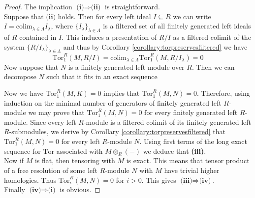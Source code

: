 \begin{proof}
The implication $\textbf{(i)}\Rightarrow \textbf{(ii)}$ is straightforward.\\
Suppose that $\textbf{(ii)}$ holds. Then for every left ideal $I\subseteq R$ we can write $I=\mathrm{colim}_{\lambda\in \Lambda}I_{\lambda}$, where $\{I_{\lambda}\}_{\lambda\in \Lambda}$ is a filtered set of all finitely generated left ideals of $R$ contained in $I$. This induces a presentation of $R/I$ as a filtered colimit of the system $\{R/I_{\lambda}\}_{\lambda\in \Lambda}$ and thus by Corollary \ref{corollary:torpreservesfiltered} we have
$$\mathrm{Tor}^R_1(M,R/I)=\mathrm{colim}_{\lambda\in \Lambda}\mathrm{Tor}^R_1(M,R/I_{\lambda})=0$$
Now suppose that $N$ is a finitely generated left module over $R$. Then we can decompose $N$ such that it fits in an exact sequence
\begin{center}
\end{center}
Now we have $\mathrm{Tor}^R_1(M,K)=0$ implies that $\mathrm{Tor}^R_1(M,N)=0$. Therefore, using induction on the minimal number of generators of finitely generated left $R$-module we may prove that $\mathrm{Tor}^R_1(M,N)=0$ for every finitely generated left $R$-module. Since every left $R$-module is a filtered colimit of its finitely generated left $R$-submodules, we derive by Corollary \ref{corollary:torpreservesfiltered} that $\mathrm{Tor}^R_1(M,N)=0$ for every left $R$-module $N$. Using first terms of the long exact sequence for $\mathrm{Tor}$ associated with $M\otimes_R(-)$ we deduce that \textbf{(iii)}.\\
Now if $M$ is flat, then tensoring with $M$ is exact. This means that tensor product of a free resolution of some left $R$-module $N$ with $M$ have trivial higher homologies. Thus $\mathrm{Tor}^R_i(M,N)=0$ for $i>0$. This gives $\textbf{(iii)}\Rightarrow \textbf{(iv)}$.\\
Finally $\textbf{(iv)}\Rightarrow \textbf{(i)}$ is obvious.
\end{proof}


